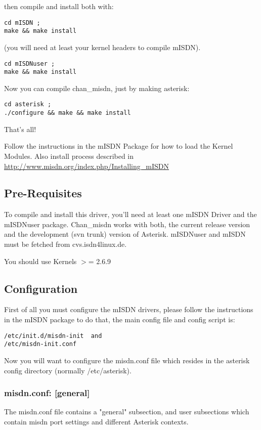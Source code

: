 then compile and install both with:

\begin{verbatim}
cd mISDN ;
make && make install
\end{verbatim}

(you will need at least your kernel headers to compile mISDN).

\begin{verbatim}
cd mISDNuser ;
make && make install
\end{verbatim}

Now you can compile chan\_misdn, just by making asterisk: 

\begin{verbatim}
cd asterisk ; 
./configure && make && make install
\end{verbatim}

That's all!

Follow the instructions in the mISDN Package for how to load the Kernel
Modules. Also install process described in \url{http://www.misdn.org/index.php/Installing_mISDN}

\subsection{Pre-Requisites}

To compile and install this driver, you'll need at least one mISDN Driver and
the mISDNuser package. Chan\_misdn works with both, the current release version
and the development (svn trunk) version of Asterisk. mISDNuser and mISDN must
be fetched from cvs.isdn4linux.de.

You should use Kernels $>$= 2.6.9 


\subsection{Configuration}

First of all you must configure the mISDN drivers, please follow the
instructions in the mISDN package to do that, the main config file and config
script is:

\begin{verbatim}
/etc/init.d/misdn-init  and
/etc/misdn-init.conf
\end{verbatim}

Now you will want to configure the misdn.conf file which resides in the
asterisk config directory (normally /etc/asterisk).

\subsubsection{misdn.conf: [general]}
The misdn.conf file contains a "general" subsection, and user subsections which
contain misdn port settings and different Asterisk contexts.

